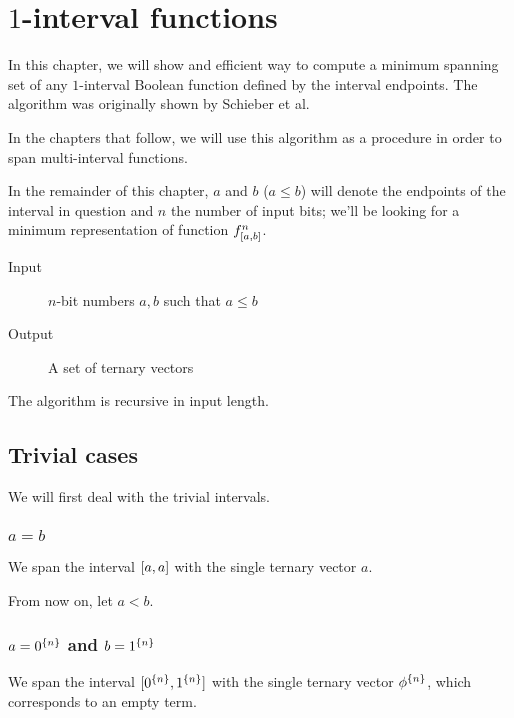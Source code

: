 \chapter{\texorpdfstring{$1$}{1}-interval functions}
\label{chap:1interval}

In this chapter,
we will show and efficient way to compute
a minimum spanning set of any $1$-interval Boolean function
defined by the interval endpoints.
The algorithm was originally shown by Schieber et al.
\cite{Schieber2005154}

In the chapters that follow,
we will use this algorithm as a procedure
in order to span multi-interval functions.

In the remainder of this chapter,
$a$ and $b$ ($a \leq b$) will denote the endpoints
of the interval in question
and $n$ the number of input bits;
we'll be looking for a minimum representation of
function $f^{n}_{[a, b]}$.

\begin{description}
\item[Input] $n$-bit numbers $a, b$ such that $a \leq b$
\item[Output] A set of ternary vectors
\end{description}

The algorithm is recursive in input length.

\section{Trivial cases}

We will first deal with the trivial intervals.

\subsection{\texorpdfstring{$a = b$}{a = b}}

We span the interval $[a, a]$
with the single ternary vector $a$.

From now on,
let $a < b$.

\subsection{\texorpdfstring{$a = 0^{\{n\}}$}{a = 0...0}
and
\texorpdfstring{$b = 1^{\{n\}}$}{b = 1...1}
}

We span the interval
$[0^{\{n\}}, 1^{\{n\}}]$
with the single ternary vector $\phi^{\{n\}}$,
which corresponds to an empty term.

